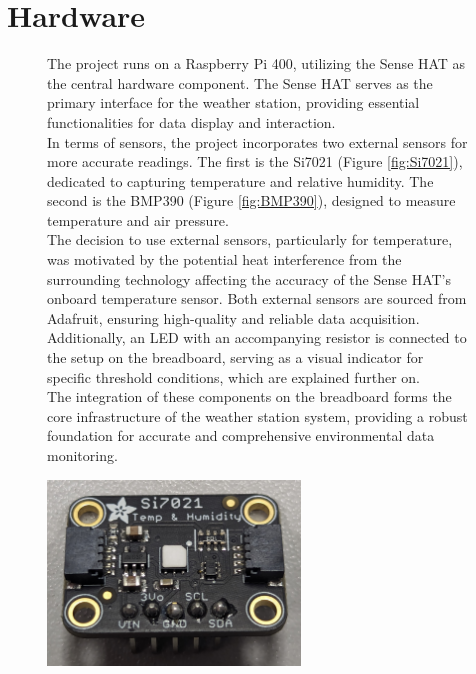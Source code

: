 \documentclass[titlepage]{article}
\begin{document}
\section{Hardware}
\begin{figure}[ht]
    \begin{minipage}{0.65\textwidth}
        The project runs on a Raspberry Pi 400, utilizing the Sense HAT as the central hardware component. 
        The Sense HAT serves as the primary interface for the weather station, providing essential functionalities for data display and interaction.\\
        In terms of sensors, the project incorporates two external sensors for more accurate readings. 
        The first is the Si7021 (Figure \ref{fig:Si7021}), dedicated to capturing temperature and relative humidity. 
        The second is the BMP390 (Figure \ref{fig:BMP390}), designed to measure temperature and air pressure.\\
        The decision to use external sensors, particularly for temperature, was motivated by the potential heat interference from the surrounding technology affecting the accuracy of the Sense HAT's onboard temperature sensor.
        Both external sensors are sourced from Adafruit, ensuring high-quality and reliable data acquisition.\\
        Additionally, an LED with an accompanying resistor is connected to the setup on the breadboard, serving as a visual indicator for specific threshold conditions, which are explained further on.\\
        The integration of these components on the breadboard forms the core infrastructure of the weather station system, providing a robust foundation for accurate and comprehensive environmental data monitoring.
    \end{minipage}
    \begin{minipage}{0.3\textwidth} 
        \centering
        \includegraphics[width=0.6\textwidth]{img/Si7021.jpg}

\end{minipage}
\end{figure}
\end{document}
